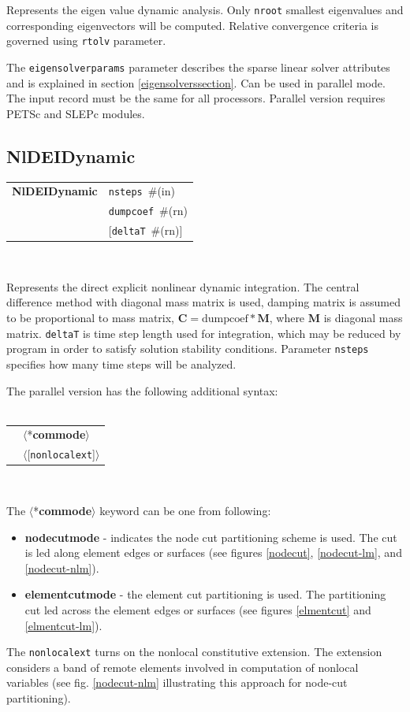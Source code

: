 \documentclass[a4paper]{article}
\makeatletter
\newcommand{\mbf}[1]{\boldsymbol{#1}}
\newcommand{\param}[1]{\texttt{#1}} %
\newcommand{\optional}[1]{[#1]} %
\newcommand{\field}[2]{\param{#1}~\#{\tiny(#2)}} %
\newcommand{\optField}[2]{\optional{\field{#1}{#2}}}
\newcommand{\optFieldnotype}[1]{[\param{#1}]}
\newcommand{\entKeyword}[1]{*\textbf{#1}} %
\newcommand{\entKeywordInst}[1]{\textbf{#1}} %
\newcommand{\Pmode}[1]{{\sffamily #1}}
\newcommand{\oofemParallel}[1]{$\langle${#1}$\rangle$}
\newcommand{\PentKeyword}[1]{\oofemParallel{\entKeyword{#1}}}
\newcommand{\PoptFieldnotype}[1]{\oofemParallel{\optFieldnotype{#1}}}
\newenvironment{record}[1][]{\begin{tabular}{|ll}}{\end{tabular}\\}
\newcommand{\recentry}[2]{{#1}&{#2}\\}
\newcounter{rcc}
\newenvironment{record}[1][\textwidth]{\setcounter{rcc}{0}\begin{tabular*}{#1}{|ll@{\extracolsep{\fill}}r}}{\end{tabular*}\\}
\newcommand{\recentry}[2]{\ifthenelse{\value{rcc}>0}{&$\backslash$ \\}{\setcounter{rcc}{1}}{#1}&{#2}}
\makeatother
\begin{document}
Represents the eigen value dynamic analysis.
Only \param{nroot} smallest eigenvalues and corresponding
eigenvectors will be computed. Relative convergence criteria is
governed using \param{rtolv} parameter.

The \param{eigensolverparams} parameter describes the sparse
linear solver attributes and is explained in section \ref{eigensolverssection}.
\Pmode{Can be used in parallel mode. The input record must be the same
for all processors. Parallel version requires PETSc and SLEPc modules.}


\subsection{NlDEIDynamic}
\label{NlDEIDynamic}
\begin{record}
  \recentry{\entKeywordInst{NlDEIDynamic}}{\field{nsteps}{in}}
  \recentry{}{\field{dumpcoef}{rn}}
  \recentry{}{\optField{deltaT}{rn}}
\end{record}

Represents the direct explicit  nonlinear dynamic  integration.
The central difference method with diagonal mass matrix is used,
damping matrix is assumed to be proportional to mass matrix, $\mbf{C}
= \mathrm{dumpcoef} * \mbf{M}$, where
$\mbf{M}$ is diagonal mass matrix. \param{deltaT} is time step length used for
integration, which may be reduced by program in order to satisfy
solution stability conditions. Parameter \param{nsteps} specifies
how many time steps will be analyzed.

The parallel version has the following additional syntax:\\ \\
\begin{record}
  \recentry{}{\PentKeyword{commode}}
  \recentry{}{\PoptFieldnotype{nonlocalext}}
\end{record}

\noindent
\Pmode{
The \PentKeyword{commode} keyword can be one from following:
\begin{itemize}
\item \entKeywordInst{nodecutmode} - indicates the node cut partitioning scheme is
used. The cut is led along element edges or surfaces (see
figures \ref{nodecut}, \ref{nodecut-lm}, and \ref{nodecut-nlm}).
\item \entKeywordInst{elementcutmode} - the element cut partitioning is used. The
partitioning cut led across the element edges or surfaces (see
figures \ref{elmentcut} and \ref{elmentcut-lm}).
\end{itemize}
\Pmode{
The \param{nonlocalext} turns on the nonlocal constitutive
extension. The extension considers a band of remote elements involved
in computation of nonlocal variables (see fig. \ref{nodecut-nlm} illustrating
this approach for node-cut partitioning).
}
}
\end{document}
